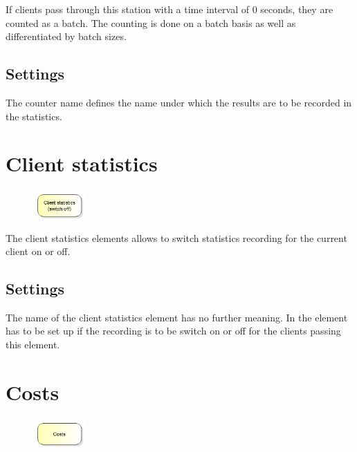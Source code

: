 If clients pass through this station with a time interval of 0 seconds, they are counted as a batch.
The counting is done on a batch basis as well as differentiated by batch sizes.

\subsection*{Settings}

The counter name defines the name under which the results are to be recorded in the statistics.


\section{Client statistics}
\label{ref:ModelElementSetStatisticsMode}

\begin{figure}
\vspace{-22pt}
\includegraphics[width=2cm]{imageModelElementSetStatisticsMode.png}
\vspace{-22pt}
\end{figure}

The client statistics elements allows to switch statistics recording
for the current client on or off.

\subsection*{Settings}

The name of the client statistics element has no further meaning.
In the element has to be set up if the recording is to be switch on or off
for the clients passing this element.


\section{Costs}
\label{ref:ModelElementCosts}

\begin{figure}
\vspace{-22pt}
\includegraphics[width=2cm]{imageModelElementCosts.png}
\vspace{-22pt}
\end{figure}


